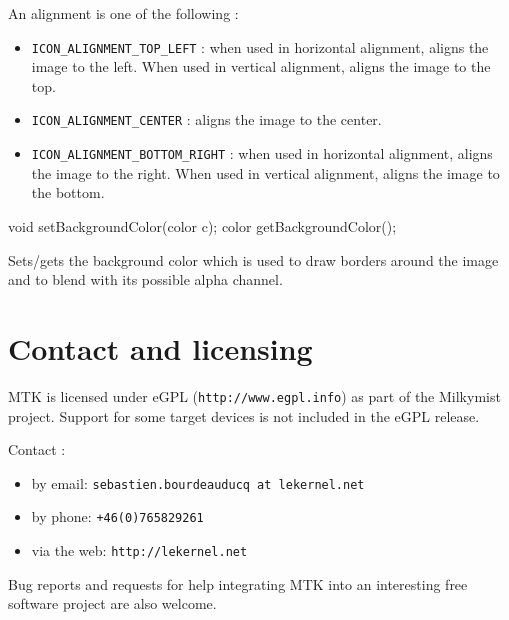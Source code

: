 \documentclass[a4paper,11pt]{journal}
\begin{document}
An alignment is one of the following :
\begin{itemize}[noitemsep,topsep=0mm]
\item \verb!ICON_ALIGNMENT_TOP_LEFT! : when used in horizontal alignment, aligns the image to the left. When used in vertical alignment, aligns the image to the top.
\item \verb!ICON_ALIGNMENT_CENTER! : aligns the image to the center.
\item \verb!ICON_ALIGNMENT_BOTTOM_RIGHT! : when used in horizontal alignment, aligns the image to the right. When used in vertical alignment, aligns the image to the bottom.
\end{itemize}

\begin{verbatimtab}
void setBackgroundColor(color c);
color getBackgroundColor();
\end{verbatimtab}
Sets/gets the background color which is used to draw borders around the image and to blend with its possible alpha channel.

\pagebreak

\section{Contact and licensing}
MTK is licensed under eGPL (\verb!http://www.egpl.info!) as part of the Milkymist project. Support for some target devices is not included in the eGPL release.

Contact : \\
\begin{itemize}[noitemsep,topsep=0mm]
\item by email: \verb!sebastien.bourdeauducq at lekernel.net!
\item by phone: \verb!+46(0)765829261!
\item via the web: \verb!http://lekernel.net!
\end{itemize}
Bug reports and requests for help integrating MTK into an interesting free software project are also welcome.
\end{document}
